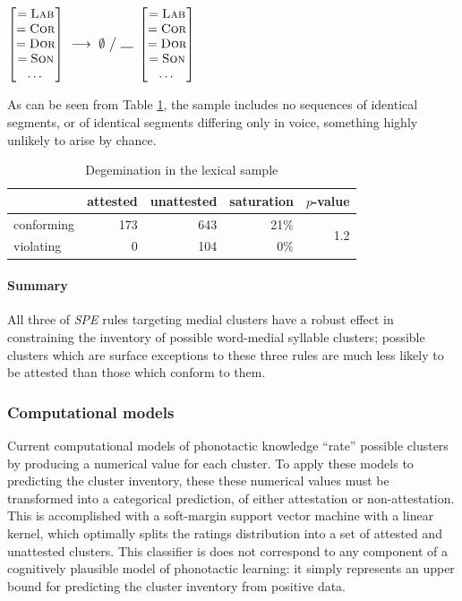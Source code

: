 \begin{example}
$\begin{bmatrix} =\textsc{Lab} \\ =\textsc{Cor} \\ =\textsc{Dor} \\ =\textsc{Son} \\ \ldots{} \end{bmatrix}~\goesto~\emptyset~\big /~\gap~\begin{bmatrix} =\textsc{Lab} \\ =\textsc{Cor} \\ =\textsc{Dor} \\ =\textsc{Son} \\ \ldots{} \end{bmatrix}$
\end{example}

\noindent
As can be seen from Table \ref{degemtab}, the sample includes no sequences of identical segments, or of identical segments differing only in voice, something highly unlikely to arise by chance.

\begin{table}
\centering
\begin{tabular}{l rrrr}
\toprule
           & attested & unattested & saturation & $p$-value \\
\midrule
conforming & 173      & 643        & 21\%       & \multirow{2}{*}{1.2\e{-10}} \\
violating  & 0        & 104        & 0\%        \\
\bottomrule
\end{tabular}
\caption{Degemination in the lexical sample}
\label{degemtab}
\end{table}

\paragraph{Summary} All three of \emph{SPE} rules targeting medial clusters have a robust effect in constraining the inventory of possible word-medial syllable clusters; possible clusters which are surface exceptions to these three rules are much less likely to be attested than those which conform to them. 

\subsubsection{Computational models}

Current computational models of phonotactic knowledge ``rate'' possible clusters by producing a numerical value for each cluster. 
To apply these models to predicting the cluster inventory, these 
these numerical values must be transformed into a categorical prediction, of either attestation or non-attestation.
This is accomplished with a soft-margin support vector machine \citep{Cortes1995} with a linear kernel, which optimally splits the ratings distribution into a set of attested and unattested clusters.
This classifier is does not correspond to any component of a cognitively plausible model of phonotactic learning: it simply represents an upper bound for predicting the cluster inventory from positive data.

